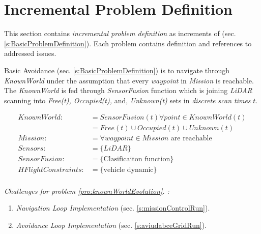 \newpage
\section{Incremental Problem Definition}\label{s:IncrementalProblemDefinition}

\noindent This section contains \emph{incremental problem definition} as increments of (sec. \ref{s:BasicProblemDefinition}). Each problem contains definition and references to addressed issues.

\begin{problem}{Basic Avoidance}\label{pro:knownWorldEvolution} (sec. \ref{s:BasicProblemDefinition}) is to navigate through \emph{KnownWorld} under the assumption that every \emph{waypoint} in \emph{Mission} is reachable. The \emph{KnownWorld} is fed through \emph{SensorFusion} function which is joining \emph{LiDAR} scanning into \emph{Free(t), Occupied(t),} and, \emph{Unknown(t)} sets in \emph{discrete scan times} $t$. 

    \begin{equation}\label{eq:basicProblemDefinition}
        \begin{aligned}
            KnownWorld:&= SensorFusion(t)\forall point\in KnownWorld(t)\\
                       &=Free(t) \cup Occupied(t) \cup Unknown(t)\\
            Mission:&= \forall waypoint\in Mission \text{ are reachable}\\
            Sensors:&= \{LiDAR\}\\
            SensorFusion:&= \{\text{Clasificaiton function}\}\\
            HFlightConstraints:&=\{\text{vehicle dynamic}\}\\
        \end{aligned}
    \end{equation}
    
    
    \noindent \emph{Challenges for problem  \ref{pro:knownWorldEvolution}. :}
    \begin{enumerate}
        \item \emph{Navigation Loop Implementation} (sec. \ref{s:missionControlRun}).
        
        \item \emph{Avoidance Loop Implementation}  (sec. \ref{s:aviudabceGridRun}).
    \end{enumerate}   
\end{problem}


